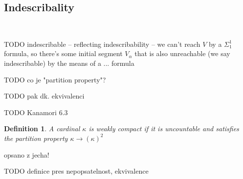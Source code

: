 \documentclass[12pt,a4paper]{article}
\newtheorem{definition}[theorem]{Definition}
\newtheorem{lemma}[theorem]{Lemma}
\newenvironment{proof}
{\noindent \textit{Proof.}}
{\hspace*{\fill} $\Box$}
\newcommand{\then}{\rightarrow}
\begin{document}
\begin{}




\subsection{Indescribality} %

\

TODO indescribable -- reflecting indescribability -- we can't reach $V$ by a $\Sigma_1^1$ formula, so there's some initial segment $V_\alpha$ that is also unreachable (we say indescribable) by the means of a ... formula

TODO co je "partition property"?

TODO pak dk. ekvivalenci

TODO Kanamori 6.3

\begin{definition}
A cardinal $\kappa$ is \emph{weakly compact} if it is uncountable and satisfies the partition property $\kappa \then (\kappa)^2$
\end{definition}
{\color{red}
opsano z jecha!

TODO definice pres nepopsatelnost, ekvivalence

\begin{comment}

\begin{lemma}
Every weakly compact cardinal is inaccessible
\end{lemma}

\begin{proof}
Let $\kappa$ b a~weakly compact cardinal. To show that $\kappa$ is regular, let us assume that $\kappa$ i the disjoint union
$\bigcup\{A_{\gamma}: \gamma < \lambda\}$ such that $\lambda < \kappa$ and $|A_{\gamma}| < \kappa$ for each $\gamma < \lambda$.
 We define a~partition $F: [\kappa]^2 \then \{0, 1\}$ as follows: $F(\{\alpha, \beta\}) = 0$ just in cas $\alpha$ and $\beta$ are the same size $A_{\gamma}$. Obviously, this partition does not have a~homogenous set $H \subset \kappa$ of size $\kappa$.
That $\kappa$ is a~strong limit cardinal follows from Lemma 9.4: (?? doplnit z jecha): If $\kappa \geq 2^{\lambda}$ for some $\lambda < \kappa$,
the because $2^{\lambda} \leq (\lambda^{+})^2$, we have $\kappa \leq (\lambda^{+})^2$ and hence $\kappa \leq (\kappa)^2$.
\end{proof}


\end{comment}}
\end{}
\end{document}
